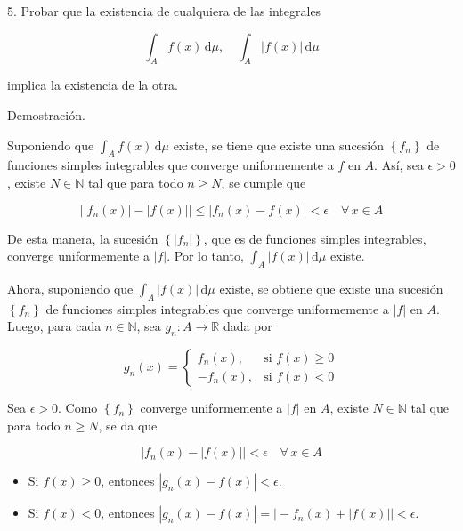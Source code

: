 \documentclass[fleqn]{article}
\begin{document}
	5. Probar que la existencia de cualquiera de las integrales 

	\begin{equation*}
		\int_{A} f(x) \, \mathrm{d} \mu, \quad \int_{A} |f(x)| \, \mathrm{d} \mu
	\end{equation*}

	implica la existencia de la otra.

	Demostración.

	Suponiendo que $ \int_{A} f(x) \, \mathrm{d} \mu $ existe, se tiene que existe una sucesión $ \left\lbrace f_n \right\rbrace $ de funciones simples integrables que converge uniformemente a $f$ en $A$. Así, sea $ \epsilon > 0 $, existe $ N \in \mathbb{N} $ tal que para todo $ n \geq N $, se cumple que 

	\begin{equation*}
		\bigl| \left| f_n(x) \right| - \left| f(x) \right| \bigr| \leq \left| f_n(x) - f(x) \right| < \epsilon \quad \forall \, x \in A
	\end{equation*}

	De esta manera, la sucesión $ \left\lbrace | f_n | \right\rbrace $, que es de funciones simples integrables, converge uniformemente a $ |f| $. Por lo tanto, $ \int_{A} |f(x)| \, \mathrm{d} \mu $ existe.

	Ahora, suponiendo que $ \int_{A} |f(x)| \, \mathrm{d} \mu $ existe, se obtiene que existe una sucesión $ \left\lbrace f_n \right\rbrace $ de funciones simples integrables que converge uniformemente a $ |f| $ en $A$. Luego, para cada $ n \in \mathbb{N} $, sea $ g_n \colon A \to \mathbb{R} $ dada por

	\begin{equation*}
		g_n (x) = \begin{cases}
			f_n (x), & \mbox{si } f(x) \geq 0 \\
			-f_n (x), & \mbox{si } f(x) < 0
		\end{cases}
	\end{equation*}

	Sea $ \epsilon > 0 $. Como $ \left\lbrace f_n \right\rbrace $ converge uniformemente a $ |f| $ en $A$, existe $ N \in \mathbb{N} $ tal que para todo $ n \geq N $, se da que 

	\begin{equation*}
		\bigl| f_n(x) - \left| f(x) \right| \bigr| < \epsilon \quad \forall \, x \in A
	\end{equation*}

	\begin{itemize}
		\item Si $ f(x) \geq 0 $, entonces $ \left| g_n(x) - f(x) \right| < \epsilon $.
		
		\item Si $ f(x) < 0 $, entonces $ \left| g_n(x) - f(x) \right| = \bigl| - f_n(x) + \left| f(x) \right| \bigr| < \epsilon $.
	\end{itemize}
\end{document}
